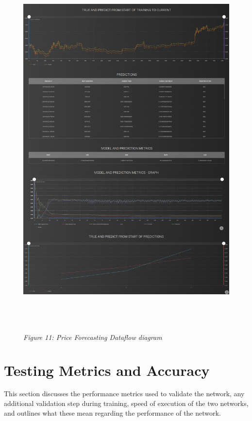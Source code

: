 \documentclass[oneside, 12pt]{article}
\begin{document}
		\begin{figure}[hbt!]
			\centering
			\includegraphics[width=14cm,height=19cm]{images/final_interface.png}
			\begin{center}
				\textit{Figure 11: Price Forecasting Dataflow diagram}
			\end{center}
		\end{figure}
		
	\newpage
	
	\section{Testing Metrics and Accuracy}
	This section discusses the performance metrics used to validate the network, any additional validation step during training, speed of execution of the two networks, and outlines what these mean regarding the performance of the network. 
	
\end{document}
